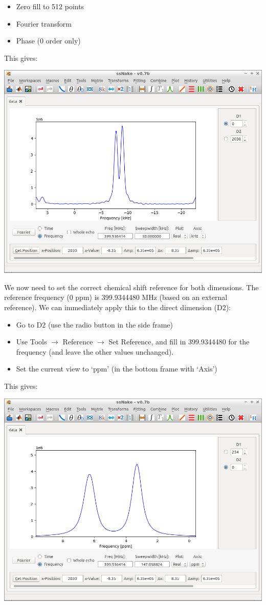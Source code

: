 \documentclass[11pt,a4paper]{article}
\begin{document}
\begin{itemize}
  \item Zero fill to 512 points
  \item Fourier transform
  \item Phase (0 order only)
\end{itemize}
This gives:
\begin{center}
\includegraphics[width=0.7\linewidth]{Figs/Fig5.png}
\end{center}

We now need to set the correct chemical shift reference for both dimensions. The reference frequency
(0 ppm) is  399.9344480 MHz (based on an external reference). We can immediately apply this to the
direct dimension (D2):


\begin{itemize}
  \item Go to D2 (use the radio button in the side frame)
  \item Use Tools $\longrightarrow$ Reference $\longrightarrow$ Set Reference, and fill in
	 399.9344480 for the frequency (and leave the other values unchanged).
	\item Set the current view to `ppm' (in the bottom frame with `Axis')
\end{itemize}
This gives:

\begin{center}
\includegraphics[width=0.7\linewidth]{Figs/Fig6.png}
\end{center}
\end{document}
